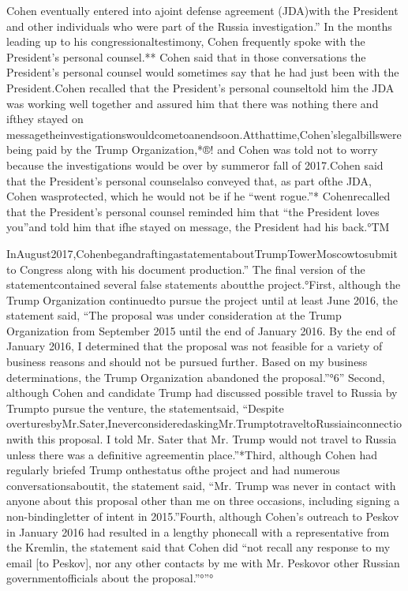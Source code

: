 Cohen eventually entered into ajoint defense agreement (JDA)with the President and other individuals who were part of the Russia investigation.” In the months leading up to his congressionaltestimony, Cohen frequently spoke with the President’s personal counsel.** Cohen said that in those conversations the President’s personal counsel would sometimes say that he had just been with the President.Cohen recalled that the President’s personal counseltold him the JDA was working well together and assured him that there was nothing there and ifthey stayed on messagetheinvestigationswouldcometoanendsoon.Atthattime,Cohen’slegalbillswere being paid by the Trump Organization,*®! and Cohen was told not to worry because the investigations would be over by summeror fall of 2017.Cohen said that the President’s personal counselalso conveyed that, as part ofthe JDA, Cohen wasprotected, which he would not be if he “went rogue.”* Cohenrecalled that the President’s personal counsel reminded him that “the President loves you”and told him that ifhe stayed on message, the President had his back.°TM

InAugust2017,CohenbegandraftingastatementaboutTrumpTowerMoscowtosubmit to Congress along with his document production.” The final version of the statementcontained several false statements aboutthe project.°First, although the Trump Organization continuedto pursue the project until at least June 2016, the statement said, “The proposal was under consideration at the Trump Organization from September 2015 until the end of January 2016. By the end of January 2016, I determined that the proposal was not feasible for a variety of business reasons and should not be pursued further. Based on my business determinations, the Trump Organization abandoned the proposal.”°6” Second, although Cohen and candidate Trump had discussed possible travel to Russia by Trumpto pursue the venture, the statementsaid, “Despite overturesbyMr.Sater,IneverconsideredaskingMr.TrumptotraveltoRussiainconnectionwith this proposal. I told Mr. Sater that Mr. Trump would not travel to Russia unless there was a definitive agreementin place.”*Third, although Cohen had regularly briefed Trump onthestatus ofthe project and had numerous conversationsaboutit, the statement said, “Mr. Trump was never in contact with anyone about this proposal other than me on three occasions, including signing a non-bindingletter of intent in 2015.”Fourth, although Cohen’s outreach to Peskov in January 2016 had resulted in a lengthy phonecall with a representative from the Kremlin, the statement said that Cohen did “not recall any response to my email [to Peskov], nor any other contacts by me with Mr. Peskovor other Russian governmentofficials about the proposal.”°”°

